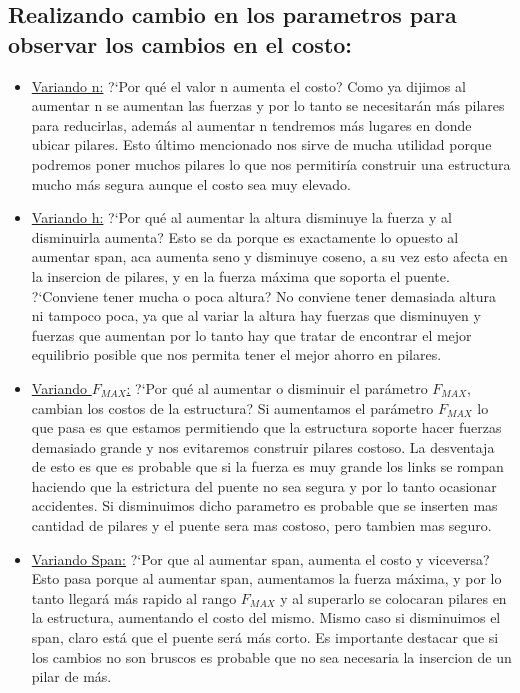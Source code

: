 \subsection{Realizando cambio en los parametros para observar los cambios en el costo:}

\begin{itemize}

\item \underline{Variando n:} ?`Por qu\'e el valor n aumenta el costo?
Como ya dijimos al aumentar n se aumentan las fuerzas y por lo tanto se necesitar\'an m\'as pilares para reducirlas, adem\'as al aumentar n tendremos m\'as lugares en donde ubicar pilares. Esto \'ultimo mencionado nos sirve de mucha utilidad porque podremos poner muchos pilares lo que nos permitir\'ia construir una estructura mucho m\'as segura aunque el costo sea muy elevado.

\item \underline{Variando h:} ?`Por qu\'e al aumentar la altura disminuye la fuerza y al disminuirla aumenta?
Esto se da porque es exactamente lo opuesto al aumentar span, aca aumenta seno y disminuye coseno, a su vez esto afecta en la insercion de pilares, y en la fuerza m\'axima que soporta el puente.\newline
?`Conviene tener mucha o poca altura?
No conviene tener demasiada altura ni tampoco poca, ya que al variar la altura hay fuerzas que disminuyen y fuerzas que aumentan por lo tanto hay que tratar de encontrar el mejor equilibrio posible que nos permita tener el mejor ahorro en pilares.

\item \underline{Variando $F_{MAX}$:} ?`Por qu\'e al aumentar o disminuir el par\'ametro $F_{MAX}$, cambian los costos de la estructura?
Si aumentamos el par\'ametro $F_{MAX}$ lo que pasa es que estamos permitiendo que la estructura soporte hacer fuerzas demasiado grande y nos evitaremos construir pilares costoso. La desventaja de esto es que es probable que si la fuerza es muy grande los links se rompan haciendo que la estrictura del puente no sea segura y por lo tanto ocasionar accidentes. Si disminuimos dicho parametro es probable que se inserten mas cantidad de pilares y el puente sera mas costoso, pero tambien mas seguro.

\item \underline{Variando Span:} ?`Por que al aumentar span, aumenta el costo y viceversa?
Esto pasa porque al aumentar span, aumentamos la fuerza m\'axima, y por lo tanto llegar\'a m\'as rapido al rango $F_{MAX}$ y al superarlo se colocaran pilares en la estructura, aumentando el costo del mismo. Mismo caso si disminuimos el span, claro est\'a que el puente ser\'a m\'as corto.
Es importante destacar que si los cambios no son bruscos es probable que no sea necesaria la insercion de un pilar de m\'as.


\end{itemize}
